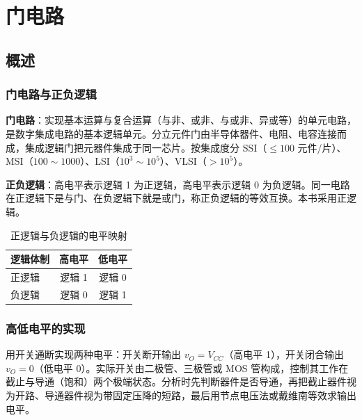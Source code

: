
\chapter{门电路}
\setlength{\parskip}{0.4em}
\setlength{\itemsep}{0.2em}
\setlength{\tabcolsep}{4pt} %

\section{概述}
\subsection{门电路与正负逻辑}
\textbf{门电路}：实现基本运算与复合运算（与非、或非、与或非、异或等）的单元电路，是数字集成电路的基本逻辑单元。分立元件门由半导体器件、电阻、电容连接而成，集成逻辑门把元器件集成于同一芯片。按集成度分 SSI（\(\leq100\) 元件/片）、MSI（\(100\sim1000\)）、LSI（\(10^3\sim10^5\)）、VLSI（\(>10^5\)）。

\textbf{正负逻辑}：高电平表示逻辑 1 为正逻辑，高电平表示逻辑 0 为负逻辑。同一电路在正逻辑下是与门、在负逻辑下就是或门，称正负逻辑的等效互换。本书采用正逻辑。

\begin{table}[!htbp]
    \centering
    \caption{正逻辑与负逻辑的电平映射}
    \begin{tabular}{lcc}
        \toprule
        逻辑体制 & 高电平 & 低电平 \\
        \midrule
        正逻辑 & 逻辑 1 & 逻辑 0 \\
        负逻辑 & 逻辑 0 & 逻辑 1 \\
        \bottomrule
    \end{tabular}
\end{table}

\subsection{高低电平的实现}
用开关通断实现两种电平：开关断开输出 \(v_O=V_{CC}\)（高电平 1），开关闭合输出 \(v_O=0\)（低电平 0）。实际开关由二极管、三极管或 MOS 管构成，控制其工作在截止与导通（饱和）两个极端状态。分析时先判断器件是否导通，再把截止器件视为开路、导通器件视为带固定压降的短路，最后用节点电压法或戴维南等效求输出电平。


